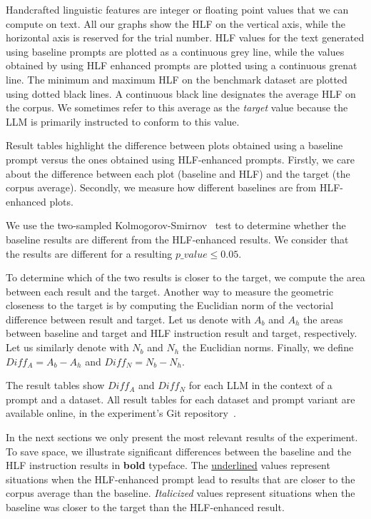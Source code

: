 \documentclass[runningheads,a4paper,11pt]{article}
\begin{document}
Handcrafted linguistic features are integer or floating point values that we
can compute on text.
All our graphs show the HLF on the vertical axis, while the horizontal axis is
reserved for the trial number.
HLF values for the text generated using baseline prompts are plotted as a
continuous grey line, while the values obtained by using HLF enhanced prompts
are plotted using a continuous grenat line.
The minimum and maximum HLF on the benchmark dataset are plotted using dotted
black lines.
A continuous black line designates the average HLF on the corpus.
We sometimes refer to this average as the \textit{target} value because the LLM
is primarily instructed to conform to this value.

Result tables highlight the difference between plots obtained using a
baseline prompt versus the ones obtained using HLF-enhanced prompts.
Firstly, we care about the difference between each plot (baseline and HLF) and
the target (the corpus average).
Secondly, we measure how different baselines are from HLF-enhanced plots.

We use the two-sampled Kolmogorov-Smirnov~\cite{kolmogorov1933,smirnov1939} test
to determine whether the baseline results are different from the HLF-enhanced
results.
We consider that the results are different for a resulting $p\_value \le 0.05$.

To determine which of the two results is closer to the target, we compute the
area between each result and the target.
Another way to measure the geometric closeness to the target is by computing the
Euclidian norm of the vectorial difference between result and target.
Let us denote with $A_b$ and $A_h$ the areas between baseline and target and HLF
instruction result and target, respectively.
Let us similarly denote with $N_b$ and $N_h$ the Euclidian norms.
Finally, we define $Diff_A = A_b - A_h$ and $Diff_N = N_b - N_h$.

The result tables show $Diff_A$ and $Diff_N$ for each LLM in the context of a
prompt and a dataset.
All result tables for each dataset and prompt variant are available online, in
the experiment's Git repository~\cite{olar2024experimentcode}.

In the next sections we only present the most relevant results of the
experiment.
To save space, we illustrate significant differences between the baseline and
the HLF instruction results in \textbf{bold} typeface.
The \underline{underlined} values represent situations when the HLF-enhanced
prompt lead to results that are closer to the corpus average than the baseline.
\textit{Italicized} values represent situations when the baseline was closer
to the target than the HLF-enhanced result.
\end{document}
